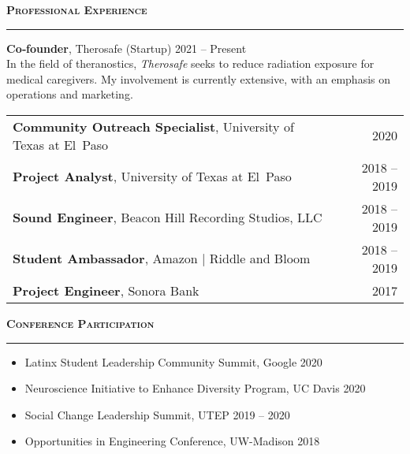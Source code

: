 \documentclass[11pt]{article}
\newcommand{\sectionheading}[1]{%
  \vspace{1.2ex}%
  {\large\bfseries\textsc{#1}}\par\vspace{0.4ex}%
  \color{gray}\rule{\linewidth}{0.5pt}\color{black}\vspace{0.6ex}%
}
\begin{document}
\sectionheading{Professional Experience}

\textbf{Co‐founder}, Therosafe (Startup) \hfill 2021 -- Present\\
In the field of theranostics, \textit{Therosafe} seeks to reduce radiation exposure for medical caregivers. My involvement is currently extensive, with an emphasis on operations and marketing.\\[0.8ex]

\begin{tabularx}{\textwidth}{@{}Y r@{}}
  \textbf{Community Outreach Specialist}, University of Texas at El Paso & 2020\\[0.4ex]
  \textbf{Project Analyst}, University of Texas at El Paso & 2018 -- 2019\\[0.4ex]
  \textbf{Sound Engineer}, Beacon Hill Recording Studios, LLC & 2018 -- 2019\\[0.4ex]
  \textbf{Student Ambassador}, Amazon | Riddle and Bloom & 2018 -- 2019\\[0.4ex]
  \textbf{Project Engineer}, Sonora Bank & 2017\\
\end{tabularx}

\sectionheading{Conference Participation}

\begin{itemize}
  \item Latinx Student Leadership Community Summit, Google \hfill 2020
  \item Neuroscience Initiative to Enhance Diversity Program, UC Davis \hfill 2020
  \item Social Change Leadership Summit, UTEP \hfill 2019 -- 2020
  \item Opportunities in Engineering Conference, UW-Madison \hfill 2018
\end{itemize}
\end{document}

